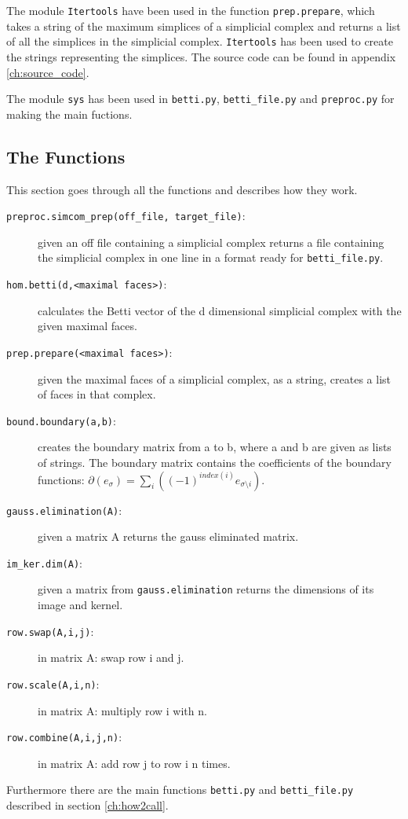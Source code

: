 \documentclass[11pt,a4paper,twoside]{report}
\begin{document}
The module \texttt{Itertools} have been used in the function \texttt{prep.prepare}, which takes a string of the maximum simplices of a simplicial complex and returns a list of all the simplices in the simplicial complex. \texttt{Itertools} has been used to create the strings representing the simplices. The source code can be found in appendix \ref{ch:source_code}.

The module \texttt{sys} has been used in \texttt{betti.py}, \texttt{betti\_file.py} and \texttt{preproc.py} for making the main fuctions.

\subsection{The Functions}

This section goes through all the functions and describes how they work.

\begin{description}
\item[\texttt{preproc.simcom\_prep(off\_file, target\_file)}:] given an off file containing a simplicial complex returns a file containing the simplicial complex in one line in a format ready for \texttt{betti\_file.py}. 
\item[\texttt{hom.betti(d,<maximal faces>)}:] calculates the Betti vector of the d dimensional simplicial complex with the given maximal faces.
\item[\texttt{prep.prepare(<maximal faces>)}:] given the maximal faces of a simplicial complex, as a string, creates a list of faces in that complex.
\item[\texttt{bound.boundary(a,b)}:]creates the boundary matrix from a to b, where a and b are given as lists of strings. The boundary matrix contains the coefficients of the boundary functions: $\partial(e_{\sigma}) = \sum_i((-1)^{index(i)}e_{\sigma\setminus i})$.
\item[\texttt{gauss.elimination(A)}:] given a matrix A returns the gauss eliminated matrix.
\item[\texttt{im\_ker.dim(A)}:] given a matrix from \texttt{gauss.elimination} returns the dimensions of its image and kernel.
\item[\texttt{row.swap(A,i,j)}:] in matrix A: swap row i and j.
\item[\texttt{row.scale(A,i,n)}:] in matrix A: multiply row i with n.
\item[\texttt{row.combine(A,i,j,n)}:] in matrix A: add row j to row i n times.
\end{description}
Furthermore there are the main functions \texttt{betti.py} and \texttt{betti\_file.py} described in section \ref{ch:how2call}.
\end{document}
